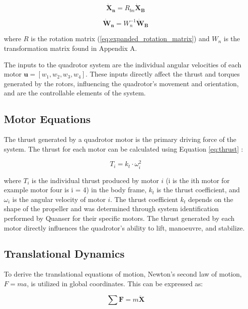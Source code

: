 \documentclass{UoNMCHA}
\numberwithin{equation}{section}
\begin{document}
\begin{equation}
\mathbf{\dot{X}_n} = R_{bn} \mathbf{\dot{X}_B}
\label{eq:velocity_transformation}
\end{equation}

\begin{equation}
\mathbf{\dot{W}_n} = W_n^{-1} \mathbf{\dot{W}_B}
\label{eq:angular_velocity_transformation}
\end{equation}
    

where \(R\) is the rotation matrix (\ref{eq:expanded_rotation_matrix}) and \(W_n\) is the transformation matrix found in Appendix A.

The inputs to the quadrotor system are the individual angular velocities of each motor \(\mathbf{u} = [w_1, w_2, w_3, w_4]\). These inputs directly affect the thrust and torques generated by the rotors, influencing the quadrotor's movement and orientation, and are the controllable elements of the system.

\subsection{Motor Equations}
The thrust generated by a quadrotor motor is the primary driving force of the system. The thrust for each motor can be calculated using Equation \ref{eq:thrust} \cite{HindawiDynamcis}:

\begin{equation}
T_i = k_t \cdot \omega_i^2
\label{eq:thrust}
\end{equation}

where \(T_i\) is the individual thrust produced by motor \(i\) (i is the ith motor for example motor four is i = 4) in the body frame, \(k_t\) is the thrust coefficient, and \(\omega_i\) is the angular velocity of motor \(i\). The thrust coefficient \(k_t\) depends on the shape of the propeller and was determined through system identification performed by Quanser for their specific motors. The thrust generated by each motor directly influences the quadrotor's ability to lift, manoeuvre, and stabilize.
\subsection{Translational Dynamics}
To derive the translational equations of motion, Newton's second law of motion, \( F = ma \), is utilized in global coordinates. This can be expressed as:

\begin{equation}
\sum \mathbf{F} = m \mathbf{\ddot{X}}
\label{eq:newton_law}
\end{equation}
\end{document}
